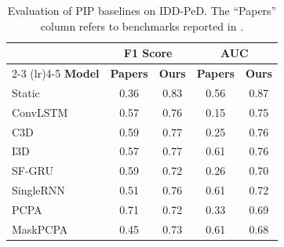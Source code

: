 \documentclass[12pt, a4paper]{article}
\begin{document}
\begin{table}[h]
\centering
\small
\setlength{\tabcolsep}{8pt}
\caption{Evaluation of PIP baselines on IDD-PeD. The ``Papers'' column refers to benchmarks reported in \cite{bokkasam2025pedestrian}.}
\label{tab:pip_idd}
\begin{tabular}{lcccc} 
\toprule
 & \multicolumn{2}{c}{\textbf{F1 Score}} & \multicolumn{2}{c}{\textbf{AUC}} \\ \cmidrule(lr){2-3} \cmidrule(lr){4-5}
\textbf{Model} & \textbf{Papers} \cite{bokkasam2025pedestrian} & \textbf{Ours} & \textbf{Papers} \cite{bokkasam2025pedestrian} & \textbf{Ours} \\ 
\midrule
Static \cite{rasouli2017are}          & 0.36 & 0.83 & 0.56 & 0.87 \\
ConvLSTM \cite{shi2015convlstm}       & 0.57 & 0.76 & 0.15 & 0.75 \\
C3D \cite{tran2015c3d}                & 0.59 & 0.77 & 0.25 & 0.76 \\
I3D \cite{carreira2017i3d}            & 0.57 & 0.77 & 0.61 & 0.76 \\
SF-GRU \cite{rasouli2019pie}          & 0.59 & 0.72 & 0.26 & 0.70 \\
SingleRNN \cite{kotseruba2016joint}   & 0.51 & 0.76 & 0.61 & 0.72 \\
PCPA \cite{rasouli2019pie}            & 0.71 & 0.72 & 0.33 & 0.69 \\
MaskPCPA \cite{bokkasam2025pedestrian}& 0.45 & 0.73 & 0.61 & 0.68 \\ 
\bottomrule
\end{tabular}
\end{table}


\end{document}

